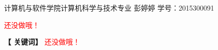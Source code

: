 \newpage


\centerline{\fangsong\bf{}}


\vskip 1cm

\begin{center}
	\kaishu
	\hspace{2cm}计算机与软件学院计算机科学与技术专业 \quad 彭婷婷 
	\vspace{5bp}
	\newline
	学号：2015300091
\end{center}

\vskip 10bp

{
\kaishu	
{} 
\textcolor{red}{还没做哦！}

\vskip 10bp

\hspace{5bp} {\textbf{【 关键词】}} 
\textcolor{red}{还没做哦！}

}